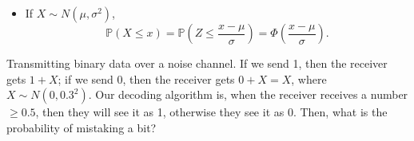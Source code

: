 \begin{remark}
\begin{itemize}
\begin{center}
        \end{center}

        \item [(iv)] If \(X \sim N(\mu , \sigma ^2)\), 
        \[
            \mathbb{P} (X \le x) = \mathbb{P} \left( Z \le \frac{x - \mu}{\sigma} \right)  = \Phi \left( \frac{x - \mu}{\sigma} \right). 
        \]
    \end{itemize}
\end{remark}

\begin{eg}
    Transmitting binary data over a noise channel. If we send 1, then the receiver gets \(1 + X\); if we send 0, then the receiver gets \(0 + X = X\), where \(X \sim N(0, 0.3^2)\). Our decoding algorithm is, when the receiver receives a number \(\ge 0.5\), then they will see it as 1, otherwise they see it as 0. Then, what is the probability of mistaking a bit?     
\end{eg}


